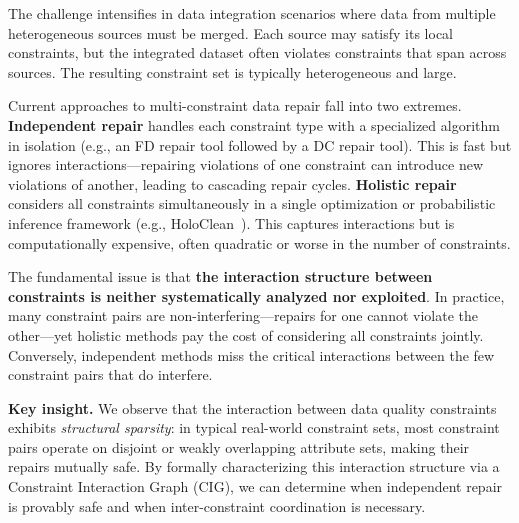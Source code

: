 \documentclass{article}
\newcommand{\cigraph}{\textsc{CIG}\xspace}
\begin{document}
The challenge intensifies in data integration scenarios where data from multiple heterogeneous sources must be merged. Each source may satisfy its local constraints, but the integrated dataset often violates constraints that span across sources. The resulting constraint set is typically heterogeneous and large.

Current approaches to multi-constraint data repair fall into two extremes.
\textbf{Independent repair} handles each constraint type with a specialized algorithm in isolation (e.g., an FD repair tool followed by a DC repair tool). This is fast but ignores interactions---repairing violations of one constraint can introduce new violations of another, leading to cascading repair cycles.
\textbf{Holistic repair} considers all constraints simultaneously in a single optimization or probabilistic inference framework (e.g., HoloClean~\citep{rekatsinas2017holoclean}). This captures interactions but is computationally expensive, often quadratic or worse in the number of constraints.

The fundamental issue is that \textbf{the interaction structure between constraints is neither systematically analyzed nor exploited}. In practice, many constraint pairs are non-interfering---repairs for one cannot violate the other---yet holistic methods pay the cost of considering all constraints jointly. Conversely, independent methods miss the critical interactions between the few constraint pairs that do interfere.

\textbf{Key insight.} We observe that the interaction between data quality constraints exhibits \emph{structural sparsity}: in typical real-world constraint sets, most constraint pairs operate on disjoint or weakly overlapping attribute sets, making their repairs mutually safe. By formally characterizing this interaction structure via a Constraint Interaction Graph (\cigraph), we can determine when independent repair is provably safe and when inter-constraint coordination is necessary.
\end{document}

